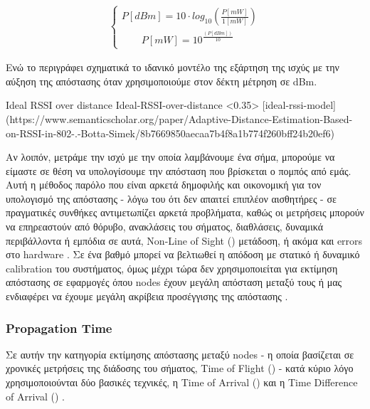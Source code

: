 \begin{align}
	\left\{
		\begin{array}{ll}
			P[dBm]= 10\cdot log_{10}\left(\frac{P[mW]}{1[mW]}\right) \\[10pt]
			\quad \quad P[mW] = 10^\frac{(P[dBm])}{10}
		\end{array}
	\right.
\end{align}

Ενώ το  περιγράφει σχηματικά το ιδανικό μοντέλο της εξάρτηση της ισχύς με την αύξηση
της απόστασης όταν χρησιμοποιούμε στον δέκτη μέτρηση σε dΒm. 


%
{Ideal RSSI over distance}%
{Ideal-RSSI-over-distance}%
<0.35>%
[ideal-rssi-model]%
(https://www.semanticscholar.org/paper/Adaptive-Distance-Estimation-Based-on-RSSI-in-802-.-Botta-Simek/8b7669850aecaa7b4f8a1b774f260bff24b20ef6)

Αν λοιπόν, μετράμε την ισχύ με την οποία λαμβάνουμε ένα σήμα, μπορούμε να είμαστε σε θέση να υπολογίσουμε την απόσταση που βρίσκεται
ο πομπός από εμάς.
Αυτή η μέθοδος παρόλο που είναι αρκετά δημοφιλής και οικονομική για τον υπολο\-γισμό της απόστασης
- λόγω του ότι δεν απαιτεί επιπλέον αισθητήρες - σε πρα\-γματικές 
συνθήκες αντιμετωπίζει αρκετά προβλήματα, καθώς οι μετρήσεις μπορούν να επηρεαστούν από θόρυβο,
ανακλάσεις του σήματος, διαθλάσεις, δυναμικά περιβάλλοντα ή εμπόδια σε αυτά, Non-Line of Sight () μετάδοση, 
ή ακόμα και errors στο hardware 
\cite{wsn-Localization-systems} \cite{ideal-rssi-model}.
Σε ένα βαθμό μπορεί να βελτιωθεί η απόδοση με στατικό ή δυναμικό calibration του συστήματος,
όμως μέχρι τώρα δεν χρησιμοποιείται για εκτίμηση απόστασης σε εφαρμογές όπου nodes έχουν μεγάλη
απόσταση μεταξύ τους ή μας ενδιαφέρει να έχουμε μεγάλη ακρίβεια προσέγγισης της απόστασης \cite{ideal-rssi-model}.

\subsubsection{Propagation Time}
Σε αυτήν την κατηγορία εκτίμησης απόστασης μεταξύ nodes - η οποία βασίζεται σε χρονικές μετρήσεις της διάδοσης του σήματος,
 Time of Flight ()
- κατά κύριο λόγο χρησιμοποιούνται δύο βασικές τεχνικές, η Time of Arrival () και η Time 
Difference of Arrival () \cite{wsn-Localization-systems}. 

